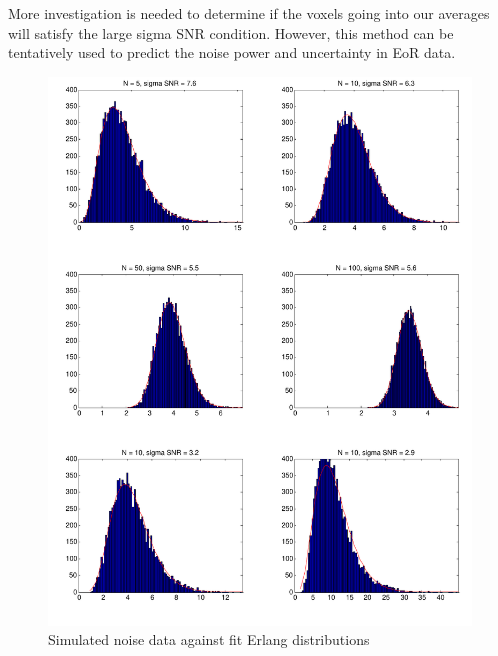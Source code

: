 \documentclass{article}
\begin{document}
More investigation is needed to determine if the voxels going into our averages will satisfy the large sigma SNR condition. However, this method can be tentatively used to predict the noise power and uncertainty in EoR data.

\begin{figure}
\includegraphics[width=\columnwidth]{erlang.pdf}
\caption{Simulated noise data against fit Erlang distributions}
\label{fig:erlang}
\end{figure}
\end{document}

